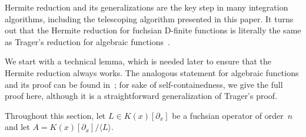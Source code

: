 \documentclass{sig-alternate}
\def\<#1>{\langle#1\rangle}
\begin{document}
Hermite reduction and its generalizations are the key step in many integration
algorithms, including the telescoping algorithm presented in this paper. It
turns out that the Hermite reduction for fuchsian D-finite functions is
literally the same as Trager's reduction for algebraic
functions~\cite{trager84}.

We start with a technical lemma, which is needed later to ensure that the
Hermite reduction always works. The analogous statement for algebraic
functions and its proof can be found in~\cite[pp. 46--47]{trager84}; for
sake of self-containedness, we give the full proof here, although it is a
straightforward generalization of Trager's proof.

Throughout this section, let $L\in K(x)[\partial_x]$ be a fuchsian operator
of order~$n$ and let $A=K(x)[\partial_x]/\<L>$.
\end{document}
